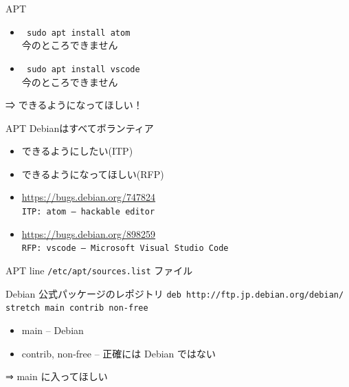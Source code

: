 \begin{frame}{APT}
\begin{itemize}[<+->]
 \item {\texttt{
sudo apt install atom
}}
\\
\pause
今のところできません

 \item {\texttt{
sudo apt install vscode
}}
\\
\pause
今のところできません
\end{itemize}
\pause
⇒ できるようになってほしい！
\end{frame}

\begin{frame}{APT}
 Debianはすべてボランティア

 \begin{itemize}
  \item できるようにしたい(ITP)
  \item できるようになってほしい(RFP)
 \end{itemize}
\pause 
\begin{itemize}
 \item \url{https://bugs.debian.org/747824} \\
       \texttt{ITP: atom -- hackable editor}
 \item \url{https://bugs.debian.org/898259} \\
       \texttt{RFP: vscode -- Microsoft Visual Studio Code}
\end{itemize}
\end{frame}

\begin{frame}{APT line}
\texttt{/etc/apt/sources.list} ファイル

Debian 公式パッケージのレポジトリ
\texttt{deb http://ftp.jp.debian.org/debian/ stretch main contrib non-free}

\pause
\begin{itemize}[<+->]
 \item main -- Debian
 \item contrib, non-free -- 正確には Debian ではない
\end{itemize}

\pause
⇒ main に入ってほしい
\end{frame}

